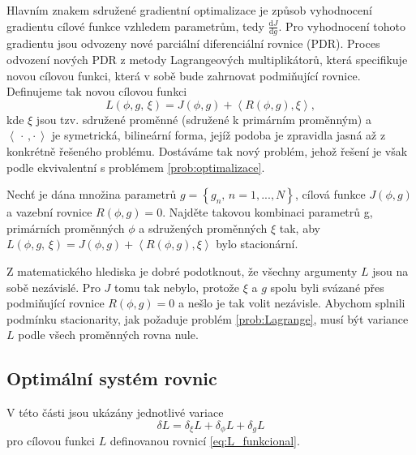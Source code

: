 Hlavním znakem sdružené gradientní optimalizace je způsob vyhodnocení gradientu cílové funkce vzhledem parametrům, tedy $ \frac{\mathrm{d}J}{\mathrm{d}g} $. 
Pro vyhodnocení tohoto gradientu jsou odvozeny nové parciální diferenciální rovnice (PDR).
Proces odvození nových PDR z metody Lagrangeových multiplikátorů, která specifikuje novou cílovou funkci, která v sobě bude zahrnovat podmiňující rovnice. 
Definujeme tak novou cílovou funkci 
\begin{equation}\label{eq:L_funkcional}
L(\phi, g,\,\xi) = J(\phi, g) + \left\langle R(\phi, g),\xi \right\rangle,
\end{equation}
kde $ \xi $ jsou tzv. sdružené proměnné (sdružené k primárním proměnným) a $  \left\langle \, \cdot\,,\cdot \,  \right\rangle $ je symetrická, bilineární forma, jejíž podoba je zpravidla jasná až z konkrétně řešeného problému.
Dostáváme tak nový problém, jehož řešení je však podle \cite{karman1997inverse} ekvivalentní s problémem \ref{prob:optimalizace}.

\begin{problem}\label{prob:Lagrange}
Nechť je dána množina parametrů $ g=\left\lbrace g_n, \, n=1,...,N\right\rbrace $, cílová funkce $ J(\phi, g) $ a vazební rovnice $ R(\phi, g)=0 $.
Najděte takovou kombinaci parametrů g, primárních proměnných $ \phi $ a sdružených proměnných $ \xi $ tak, aby $ L(\phi, g,\,\xi) = J(\phi, g) + \left\langle R(\phi, g),\xi \right\rangle$ bylo  stacionární.
\end{problem}

Z matematického hlediska je dobré podotknout, že všechny argumenty $ L $ jsou na sobě nezávislé. Pro $ J $ tomu tak nebylo, protože $ \xi $ a $ g $ spolu byli svázané přes podmiňující rovnice $ R(\phi, g)=0 $ a nešlo je tak volit nezávisle. Abychom splnili podmínku stacionarity, jak požaduje problém \ref{prob:Lagrange}, musí být variance $ L $ podle všech proměnných rovna nule.

\subsection{Optimální systém rovnic}
V této části jsou ukázány jednotlivé variace 
\begin{equation}\label{eq:L_variace}
\delta L = \delta_\xi L + \delta_\phi L + \delta_g L
\end{equation} 
pro cílovou funkci $ L $ definovanou rovnicí \ref{eq:L_funkcional}.
